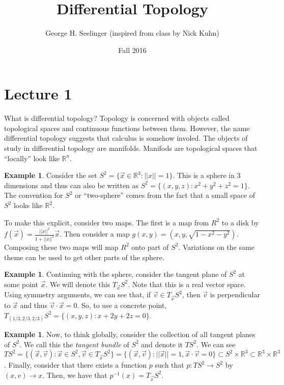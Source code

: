 \documentclass[11pt,leqno,oneside]{amsart}
\title[Differential Topology]{Differential Topology}
\author{George H. Seelinger (inspired from class by Nick Kuhn)}
\date{Fall 2016}
\newcommand{\R}{{\mathbb R}} %
\theoremstyle{definition}
\newtheorem{example}[thm]{Example}
\numberwithin{equation}{section}
\begin{document}
\maketitle
\section{Lecture 1}

What is differential topology? Topology is concerned with objects called
topological spaces and continuous functions between them. However, the name
differential topology suggests that calculus is somehow involed. The objects of
study in differential topology are manifolds. Manifods are topological spaces
that ``locally'' look like $\R^n$.

\begin{example}
    Consider the set $S^2 = \{ \vec{x} \in \R^3: ||x||=1\}$. This is a sphere
    in 3 dimensions and thus can also be written as $S^2 = \{(x,y,z) :
    x^2+y^2+z^2=1\}$. The convention for $S^2$ or ``two-sphere'' comes from the
    fact that a small space of $S^2$ looks like $\R^2$.

    To make this explicit, consider two maps. The first is a map from $R^2$ to
    a disk by $f(\vec{x}) = \frac{||x||^2}{1+||x||^2} \vec{x}$. Then consider a
    map $g(x,y) = (x,y,\sqrt{1-x^2-y^2})$. Composing these two maps will map
    $R^2$ onto part of $S^2$. Variations on the same theme can be used to get
    other parts of the sphere.
\end{example}

\begin{example}
    Continuing with the sphere, consider the tangent plane of $S^2$ at some
    point $\vec{x}$. We will denote this $T_{\vec{x}}S^2$. Note that this is a
    real vector space. Using symmetry arguments, we can see that, if $\vec{v}
    \in T_{\vec{x}}S^2$, then $\vec{v}$ is perpendicular to $\vec{x}$ and thus
    $\vec{v} \cdot \vec{x} = 0$. So, to use a concrete point,
    $T_{(1/3,2/3,2/3)} S^2 = \{(x,y,z) : x+2y+2z=0\}$.
\end{example}
\begin{example}
    Now, to think globally, consider the collection of all tangent planes of
    $S^2$. We call this the \emph{tangent bundle} of $S^2$ and denote it
    $TS^2$. We can see $TS^2 = \{(\vec{x}, \vec{v}): \vec{x} \in S^2, \vec{v}
    \in T_{\vec{x}} S^2\} = \{(\vec{x},\vec{v}) : ||\vec{x}|| = 1, \vec{x}
    \cdot \vec{v} = 0\} \subset S^2 \times \R^3 \subset \R^3 \times \R^3$.
    Finally, consider that there exists a function $p$ such that $p: TS^2 \to
    S^2$ by $(x,v) \to x$. Then, we have that $p^{-1}(x) = T_{\vec{x}}S^2$. 
\end{example}
\end{document}
